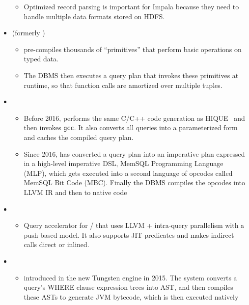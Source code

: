 \documentclass[11pt]{article}
\begin{document}
\begin{itemize}
\begin{itemize}
        \item
        Optimized record parsing is important for Impala because they need to handle multiple 
        data formats stored on HDFS.
    \end{itemize}
    
    \item {} (formerly )~\cite{raducanu2013}
    \begin{itemize}
        \item
         pre-compiles thousands of ``primitives'' that perform basic operations 
        on typed data.
        
        \item
        The DBMS then executes a query plan that invokes these primitives at runtime, so that 
        function calls are amortized over multiple tuples.
    \end{itemize}
    
    \item {}
    \begin{itemize}
        \item
        Before 2016,  performs the same C/C++ code generation as 
        HIQUE~\cite{krikellas2010} and then invokes \texttt{gcc}.
        It also converts all queries into a parameterized form and caches the compiled query plan.
        
        \item 
        Since 2016,  has converted a query plan into an imperative plan expressed in a 
        high-level imperative DSL, MemSQL Programming Language (MLP), which gets executed into a 
        second language of opcodes called MemSQL Bit Code (MBC). Finally the DBMS compiles the 
        opcodes into LLVM IR and then to native code
    \end{itemize}

    \item {}
    \begin{itemize}
        \item 
        Query accelerator for / that uses LLVM + intra-query 
		parallelism with a push-based model. It also supports JIT predicates and makes indirect 
		calls direct or inlined. 
    \end{itemize}

    \item {}
    \begin{itemize}
        \item 
         introduced in the new Tungsten engine in 2015.
        The system converts a query's WHERE clause expression trees into AST, and then compiles 
        these ASTs to generate JVM bytecode, which is then executed natively
    \end{itemize}


\end{itemize}
\end{document}
